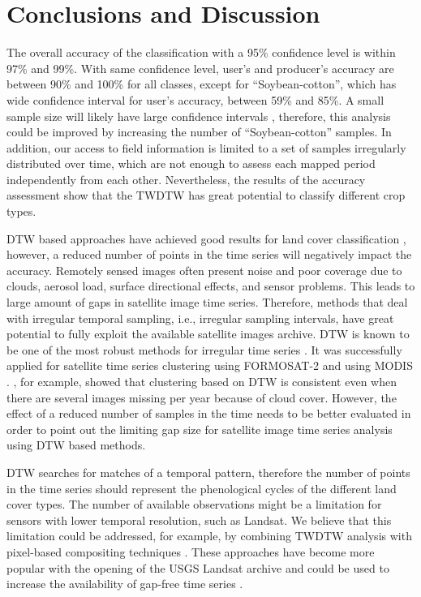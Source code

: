 \documentclass[article,shortnames]{jss}
\begin{document}
\hypertarget{conclusions-and-discussion}{%
\section{Conclusions and Discussion}\label{conclusions-and-discussion}}

The overall accuracy of the classification with a 95\% confidence level
is within 97\% and 99\%. With same confidence level, user's and
producer's accuracy are between 90\% and 100\% for all classes, except
for ``Soybean-cotton'', which has wide confidence interval for user's
accuracy, between 59\% and 85\%. A small sample size will likely have
large confidence intervals \citep{Foody:2009}, therefore, this analysis
could be improved by increasing the number of ``Soybean-cotton''
samples. In addition, our access to field information is limited to a
set of samples irregularly distributed over time, which are not enough
to assess each mapped period independently from each other.
Nevertheless, the results of the accuracy assessment show that the TWDTW
has great potential to classify different crop types.

DTW based approaches have achieved good results for land cover
classification \citep{Petitjean:2012, Maus:2016}, however, a reduced
number of points in the time series will negatively impact the accuracy.
Remotely sensed images often present noise and poor coverage due to
clouds, aerosol load, surface directional effects, and sensor problems.
This leads to large amount of gaps in satellite image time series.
Therefore, methods that deal with irregular temporal sampling, i.e.,
irregular sampling intervals, have great potential to fully exploit the
available satellite images archive. DTW is known to be one of the most
robust methods for irregular time series
\citep{Keogh:2005, Tormene:2009}. It was successfully applied for
satellite time series clustering using FORMOSAT-2 \citep{Petitjean:2012}
and using MODIS \citep{Maus:2016}. \citet{Petitjean:2012}, for example,
showed that clustering based on DTW is consistent even when there are
several images missing per year because of cloud cover. However, the
effect of a reduced number of samples in the time needs to be better
evaluated in order to point out the limiting gap size for satellite
image time series analysis using DTW based methods.

DTW searches for matches of a temporal pattern, therefore the number of
points in the time series should represent the phenological cycles of
the different land cover types. The number of available observations
might be a limitation for sensors with lower temporal resolution, such
as Landsat. We believe that this limitation could be addressed, for
example, by combining TWDTW analysis with pixel-based compositing
techniques \citep{Griffiths:2013, White:2014}. These approaches have
become more popular with the opening of the USGS Landsat archive and
could be used to increase the availability of gap-free time series
\citep{Gomez:2016}.
\end{document}
